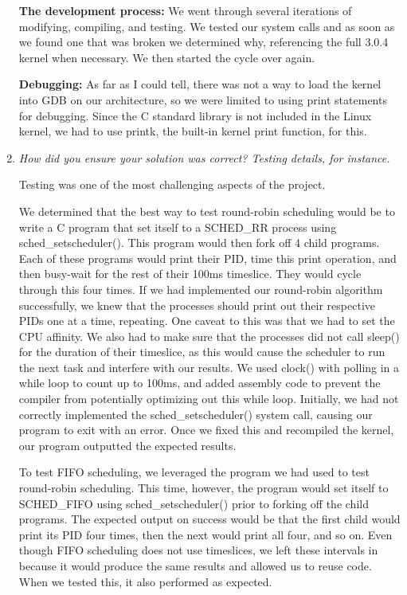 \documentclass[letterpaper,10pt,titlepage]{article}
\newcommand{\tab}{\hspace*{2em}} %
\begin{document}
\begin{enumerate}
\tab \textbf{The development process:} We went through several iterations of modifying, compiling, and testing. We tested our system calls and as soon as we found one that was broken we determined why, referencing the full 3.0.4 kernel when necessary. We then started the cycle over again.

\tab \textbf{Debugging:} As far as I could tell, there was not a way to load the kernel into GDB on our architecture, so we were limited to using print statements for debugging. Since the C standard library is not included in the Linux kernel, we had to use printk, the built-in kernel print function, for this.

\item \emph{How did you ensure your solution was correct? Testing details, for instance.}

\tab Testing was one of the most challenging aspects of the project. 

\tab We determined that the best way to test round-robin scheduling would be to write a C program that set itself to a SCHED\_RR process using sched\_setscheduler(). This program would then fork off 4 child programs. Each of these programs would print their PID, time this print operation, and then busy-wait for the rest of their 100ms timeslice. They would cycle through this four times. If we had implemented our round-robin algorithm successfully, we knew that the processes should print out their respective PIDs one at a time, repeating. One caveat to this was that we had to set the CPU affinity. We also had to make sure that the processes did not call sleep() for the duration of their timeslice, as this would cause the scheduler to run the next task and interfere with our results. We used clock() with polling in a while loop to count up to 100ms, and added assembly code to prevent the compiler from potentially optimizing out this while loop. Initially, we had not correctly implemented the sched\_setscheduler() system call, causing our program to exit with an error. Once we fixed this and recompiled the kernel, our program outputted the expected results.

\tab To test FIFO scheduling, we leveraged the program we had used to test round-robin scheduling. This time, however, the program would set itself to SCHED\_FIFO using sched\_setscheduler() prior to forking off the child programs. The expected output on success would be that the first child would print its PID four times, then the next would print all four, and so on. Even though FIFO scheduling does not use timeslices, we left these intervals in because it would produce the same results and allowed us to reuse code. When we tested this, it also performed as expected.


\end{enumerate}
\end{document}
